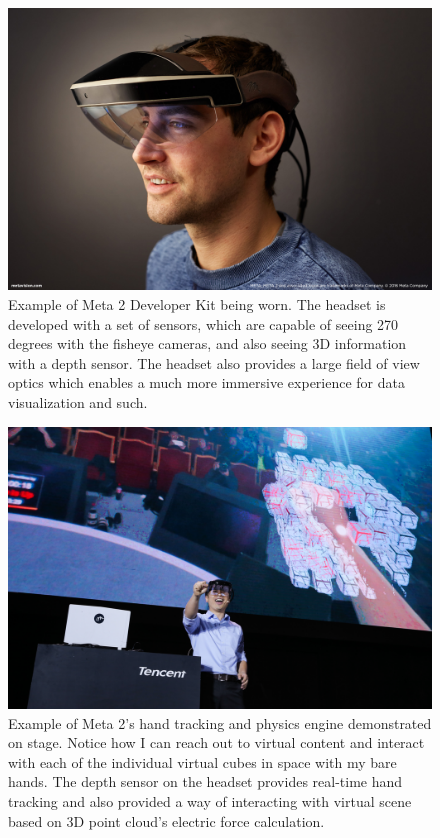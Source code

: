 \begin{figure}
\center
 \includegraphics[width=5in]{ch7/figures/Meta-Meta-2-Being-Worn-B.jpg}
 \caption{Example of Meta 2 Developer Kit being worn. The headset is developed with a set of sensors, which are capable of seeing 270 degrees with the fisheye cameras, and also seeing 3D information with a depth sensor. The headset also provides a large field of view optics which enables a much more immersive experience for data visualization and such.}
 \label{fig:meta2}
\end{figure}

\begin{figure}
\center
 \includegraphics[width=5in]{ch7/figures/tencent.jpg}
 \caption{Example of Meta 2's hand tracking and physics engine demonstrated on stage. Notice how I can reach out to virtual content and interact with each of the individual virtual cubes in space with my bare hands. The depth sensor on the headset provides real-time hand tracking and also provided a way of interacting with virtual scene based on 3D point cloud's electric force calculation.}
 \label{fig:meta2onstage}
\end{figure}


